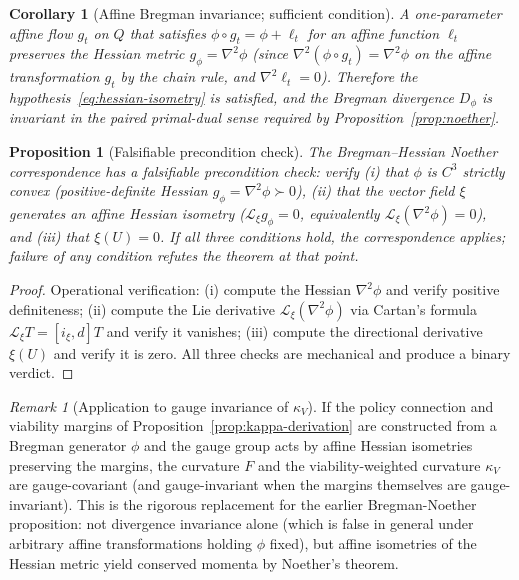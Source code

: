 \documentclass[11pt,a4paper]{article}
\theoremstyle{plain}
\newtheorem{proposition}[theorem]{Proposition}
\newtheorem{corollary}[theorem]{Corollary}
\theoremstyle{definition}
\theoremstyle{remark}
\newtheorem{remark}[theorem]{Remark}
\newcommand{\kk}{\kappa_{\!V}}
\begin{document}
\begin{corollary}[Affine Bregman invariance; sufficient condition]
\label{cor:affine-bregman}
A one-parameter affine flow $g_t$ on $Q$ that satisfies
$\phi \circ g_t = \phi + \ell_t$ for an affine function $\ell_t$
preserves the Hessian metric $g_\phi = \nabla^2 \phi$ (since
$\nabla^2(\phi \circ g_t) = \nabla^2 \phi$ on the affine transformation
$g_t$ by the chain rule, and $\nabla^2 \ell_t = 0$). Therefore the
hypothesis~\eqref{eq:hessian-isometry} is satisfied, and the Bregman
divergence $D_\phi$ is invariant in the paired primal-dual sense
required by Proposition~\ref{prop:noether}.
\end{corollary}

\begin{proposition}[Falsifiable precondition check]
\label{prop:noether-precondition}
The Bregman--Hessian Noether correspondence has a falsifiable
precondition check: verify (i) that $\phi$ is $C^3$ strictly convex
(positive-definite Hessian $g_\phi = \nabla^2 \phi \succ 0$), (ii)
that the vector field $\xi$ generates an affine Hessian isometry
($\mathcal L_\xi g_\phi = 0$, equivalently $\mathcal L_\xi
(\nabla^2 \phi) = 0$), and (iii) that $\xi(U) = 0$. If all three
conditions hold, the correspondence applies; failure of any condition
refutes the theorem at that point.
\end{proposition}

\begin{proof}
Operational verification: (i) compute the Hessian $\nabla^2 \phi$ and
verify positive definiteness; (ii) compute the Lie derivative
$\mathcal L_\xi (\nabla^2 \phi)$ via Cartan's formula
$\mathcal L_\xi T = [i_\xi, d] T$ and verify it vanishes; (iii) compute
the directional derivative $\xi(U)$ and verify it is zero. All three
checks are mechanical and produce a binary verdict.
\end{proof}

\begin{remark}[Application to gauge invariance of $\kk$]
If the policy connection and viability margins of
Proposition~\ref{prop:kappa-derivation} are constructed from a Bregman
generator $\phi$ and the gauge group acts by affine Hessian isometries
preserving the margins, the curvature $F$ and the viability-weighted
curvature $\kk$ are gauge-covariant (and gauge-invariant when the
margins themselves are gauge-invariant). This is the rigorous
replacement for the earlier Bregman-Noether proposition: not divergence
invariance alone (which is false in general under arbitrary affine
transformations holding $\phi$ fixed), but affine isometries of the
Hessian metric yield conserved momenta by Noether's theorem.
\end{remark}
\end{document}

